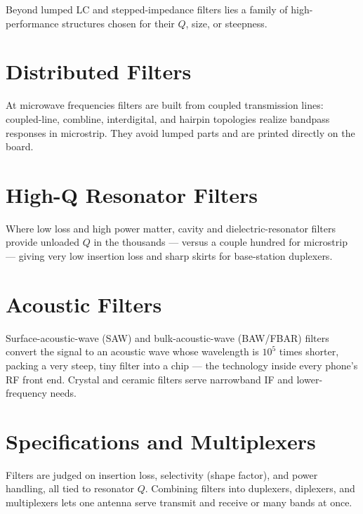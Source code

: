 Beyond lumped LC and stepped-impedance filters lies a family of high-performance
structures chosen for their $Q$, size, or steepness.

\section{Distributed Filters}
At microwave frequencies filters are built from coupled transmission lines:
coupled-line, combline, interdigital, and hairpin topologies realize bandpass
responses in microstrip. They avoid lumped parts and are printed directly on the
board.

\section{High-Q Resonator Filters}
Where low loss and high power matter, cavity and dielectric-resonator filters
provide unloaded $Q$ in the thousands --- versus a couple hundred for microstrip
--- giving very low insertion loss and sharp skirts for base-station duplexers.

\section{Acoustic Filters}
Surface-acoustic-wave (SAW) and bulk-acoustic-wave (BAW/FBAR) filters convert the
signal to an acoustic wave whose wavelength is $10^5$ times shorter, packing a
very steep, tiny filter into a chip --- the technology inside every phone's RF
front end. Crystal and ceramic filters serve narrowband IF and lower-frequency
needs.

\section{Specifications and Multiplexers}
Filters are judged on insertion loss, selectivity (shape factor), and power
handling, all tied to resonator $Q$. Combining filters into duplexers, diplexers,
and multiplexers lets one antenna serve transmit and receive or many bands at
once.
